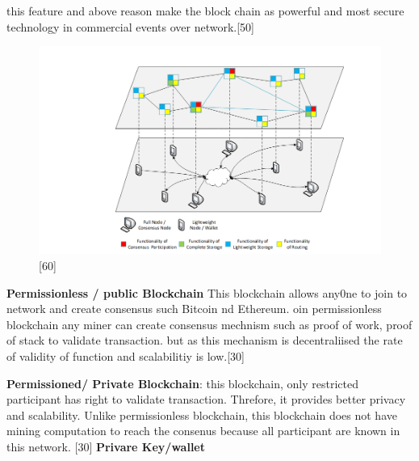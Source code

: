 this feature and above reason make the block chain as powerful and most secure technology in commercial events over network.[50]

\begin{center}
	\begin{figure}[htb!]
		
		\begin{minipage}{0.55\linewidth}
			\centering
			\includegraphics[width=1.95\textwidth]{images/chap01_P2P.png}
		\end{minipage}
		\caption[Permissionless blockchain network. The P2P links between consensus nodes are shown in blue.]{[60]}
		
		
	\end{figure}
	
\end{center}

\textbf{Permissionless / public Blockchain} This blockchain allows any0ne to join to network and create consensus such Bitcoin nd Ethereum. oin permissionless  blockchain any miner can create consensus mechnism such as proof of work, proof of stack to validate transaction. but as this mechanism is decentraliised the rate of validity of function and scalabilitiy is low.[30]

\textbf{Permissioned/ Private Blockchain}: this blockchain, only restricted  participant has right to validate transaction. Threfore, it provides better privacy and scalability. Unlike permissionless blockchain, this blockchain does not have  mining computation to reach the consenus because all participant are known in this network. [30]
\textbf{Privare Key/wallet}

